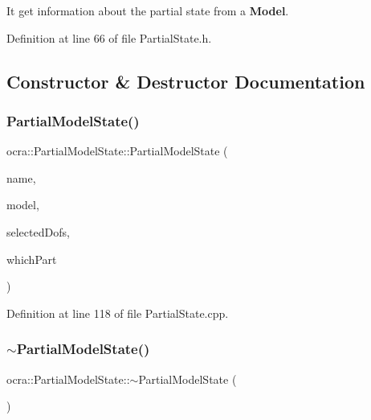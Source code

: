 It get information about the partial state from a {\bfseries Model}. 

Definition at line 66 of file Partial\+State.\+h.



\subsection{Constructor \& Destructor Documentation}
\hypertarget{classocra_1_1PartialModelState_aad632d12d35f5982df12d949f92d4937}{}\label{classocra_1_1PartialModelState_aad632d12d35f5982df12d949f92d4937} 
\subsubsection{\texorpdfstring{Partial\+Model\+State()}{PartialModelState()}}
{\footnotesize\ttfamily ocra\+::\+Partial\+Model\+State\+::\+Partial\+Model\+State (\begin{DoxyParamCaption}\item[{const std\+::string \&}]{name,  }\item[{const Model \&}]{model,  }\item[{const Eigen\+::\+Vector\+Xi \&}]{selected\+Dofs,  }\item[{int}]{which\+Part }\end{DoxyParamCaption})}



Definition at line 118 of file Partial\+State.\+cpp.

\hypertarget{classocra_1_1PartialModelState_a59cf8faac5922dc7691c540d519fa705}{}\label{classocra_1_1PartialModelState_a59cf8faac5922dc7691c540d519fa705} 
\subsubsection{\texorpdfstring{$\sim$\+Partial\+Model\+State()}{~PartialModelState()}}
{\footnotesize\ttfamily ocra\+::\+Partial\+Model\+State\+::$\sim$\+Partial\+Model\+State (\begin{DoxyParamCaption}{ }\end{DoxyParamCaption})\hspace{0.3cm}{\ttfamily [virtual]}}



